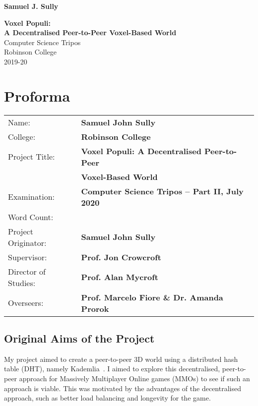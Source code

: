 \documentclass[10pt,twoside,notitlepage,a4paper]{report}
\begin{document}
	
	
	
	\pagestyle{empty}
	
	\hfill{\LARGE \bf Samuel J. Sully}
	
	\vspace*{60mm}
	\begin{center}
		\Huge
		{\bf Voxel Populi:\\ A Decentralised Peer-to-Peer Voxel-Based World} \\
		\vspace*{5mm}
		Computer Science Tripos \\
		\vspace*{5mm}
		Robinson College \\
		\vspace*{5mm}
		2019-20
	\end{center}
	
	\cleardoublepage
	
	\setcounter{page}{1}
	\pagestyle{plain}
	
	\chapter*{Proforma}
	
	{\large
		\begin{tabular}{ll}
			Name:               & \bf Samuel John Sully\\
			College:            & \bf Robinson College\\
			Project Title:      & \bf Voxel Populi: A Decentralised Peer-to-Peer\\ 
								& \bf Voxel-Based World\\
			Examination:        & \bf Computer Science Tripos -- Part II, July 2020\\
			Word Count:         & \bf \footnotemark[1]\\
			Project Originator: & \bf Samuel John Sully\\
			Supervisor:         & \bf Prof. Jon Crowcroft\\
			Director of Studies:& \bf Prof. Alan Mycroft\\
			Overseers:          & \bf Prof. Marcelo Fiore \& Dr. Amanda Prorok 
		\end{tabular}
	}
	
	\section*{Original Aims of the Project}
	My project aimed to create a peer-to-peer 3D world using a distributed hash table (DHT), namely Kademlia~\cite{kademlia}. I aimed to explore this decentralised, peer-to-peer approach for Massively Multiplayer Online games (MMOs) to see if such an approach is viable. This was motivated by the advantages of the decentralised approach, such as better load balancing and longevity for the game.
	
\end{document}
